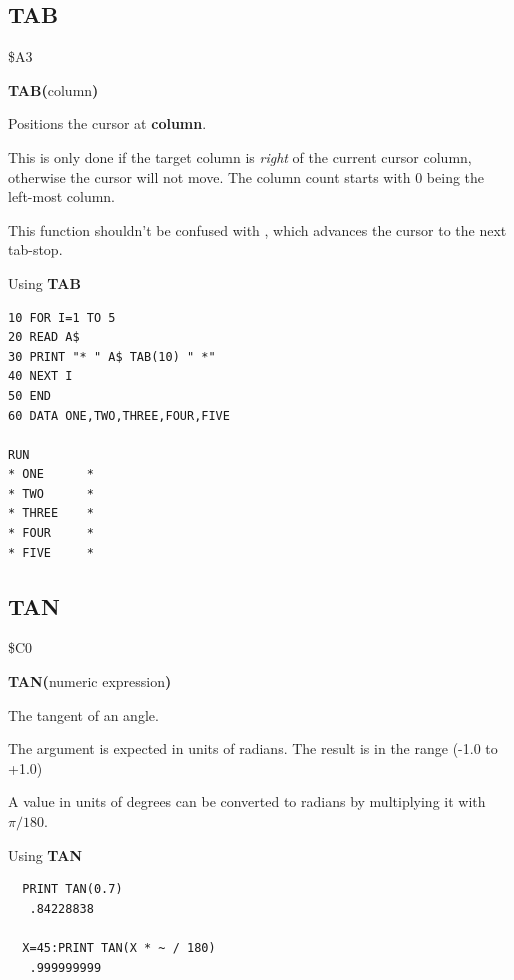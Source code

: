 \subsection{TAB}
\begin{description}[leftmargin=2cm,style=nextline]
\item [Token:] \$A3
\item [Format:] {\bf TAB(}column{\bf)}
\item [Returns:] Positions the cursor at {\bf column}.

               This is only done if the target column is {\it right}
               of the current cursor column, otherwise the cursor
               will not move. The column count starts with 0 being the
               left-most column.

\item [Remarks:] This function shouldn't be confused with
               , which advances the cursor to the next
               tab-stop.

\item [Example:] Using {\bf TAB}
\begin{tcolorbox}[colback=black,coltext=white]
\verbatimfont{\codefont}
\begin{verbatim}
10 FOR I=1 TO 5
20 READ A$
30 PRINT "* " A$ TAB(10) " *"
40 NEXT I
50 END
60 DATA ONE,TWO,THREE,FOUR,FIVE

RUN
* ONE      *
* TWO      *
* THREE    *
* FOUR     *
* FIVE     *
\end{verbatim}
\end{tcolorbox}
\end{description}


\newpage
\subsection{TAN}
\begin{description}[leftmargin=2cm,style=nextline]
\item [Token:] \$C0
\item [Format:] {\bf TAN(}numeric expression{\bf)}
\item [Returns:] The tangent of an angle.

               The argument is expected in units of radians.
               The result is in the range (-1.0 to +1.0)

\item [Remarks:] A value in units of degrees
                 can be converted to radians
                 by multiplying it with $\pi/180$.
\item [Example:] Using {\bf TAN}
\begin{tcolorbox}[colback=black,coltext=white]
\verbatimfont{\codefont}
\begin{verbatim}
  PRINT TAN(0.7)
   .84228838

  X=45:PRINT TAN(X * ~ / 180)
   .999999999
\end{verbatim}
\end{tcolorbox}
\end{description}


